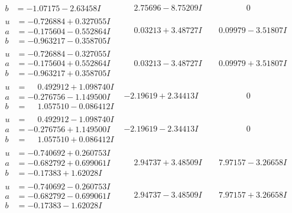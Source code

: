 \documentclass[1p]{elsarticle_modified}
\theoremstyle{definition}
\begin{document}
$$\begin{array}{c|c|c}
\begin{aligned}
b &= -1.07175 - 2.63458 I\end{aligned}
 & \phantom{-}2.75696 - 8.75209 I & \phantom{-0.000000 } 0 \\ \hline\begin{aligned}
u &= -0.726884 + 0.327055 I \\
a &= -0.175604 - 0.552864 I \\
b &= -0.963217 - 0.358705 I\end{aligned}
 & \phantom{-}0.03213 + 3.48727 I & \phantom{-}0.09979 - 3.51807 I \\ \hline\begin{aligned}
u &= -0.726884 - 0.327055 I \\
a &= -0.175604 + 0.552864 I \\
b &= -0.963217 + 0.358705 I\end{aligned}
 & \phantom{-}0.03213 - 3.48727 I & \phantom{-}0.09979 + 3.51807 I \\ \hline\begin{aligned}
u &= \phantom{-}0.492912 + 1.098740 I \\
a &= -0.276756 - 1.149500 I \\
b &= \phantom{-}1.057510 - 0.086412 I\end{aligned}
 & -2.19619 + 2.34413 I & \phantom{-0.000000 } 0 \\ \hline\begin{aligned}
u &= \phantom{-}0.492912 - 1.098740 I \\
a &= -0.276756 + 1.149500 I \\
b &= \phantom{-}1.057510 + 0.086412 I\end{aligned}
 & -2.19619 - 2.34413 I & \phantom{-0.000000 } 0 \\ \hline\begin{aligned}
u &= -0.740692 + 0.260753 I \\
a &= -0.682792 + 0.699061 I \\
b &= -0.17383 + 1.62028 I\end{aligned}
 & \phantom{-}2.94737 + 3.48509 I & \phantom{-}7.97157 - 3.26658 I \\ \hline\begin{aligned}
u &= -0.740692 - 0.260753 I \\
a &= -0.682792 - 0.699061 I \\
b &= -0.17383 - 1.62028 I\end{aligned}
 & \phantom{-}2.94737 - 3.48509 I & \phantom{-}7.97157 + 3.26658 I \\ \hline\begin{aligned}

\end{aligned}
\end{array}$$
\end{document}

